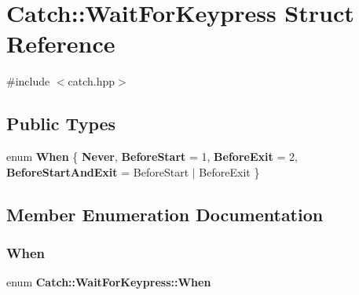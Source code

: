 \section{Catch\+::Wait\+For\+Keypress Struct Reference}
\label{struct_catch_1_1_wait_for_keypress}


{\ttfamily \#include $<$catch.\+hpp$>$}

\subsection*{Public Types}
\begin{DoxyCompactItemize}
\item 
enum \textbf{ When} \{ \textbf{ Never}, 
\textbf{ Before\+Start} = 1, 
\textbf{ Before\+Exit} = 2, 
\textbf{ Before\+Start\+And\+Exit} = Before\+Start $\vert$ Before\+Exit
 \}
\end{DoxyCompactItemize}


\subsection{Member Enumeration Documentation}
\mbox{\label{struct_catch_1_1_wait_for_keypress_a2e8c4369d0a605d64e3e83b5af3399ba}} 
\subsubsection{When}
{\footnotesize\ttfamily enum \textbf{ Catch\+::\+Wait\+For\+Keypress\+::\+When}}

